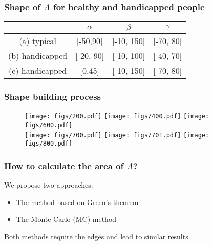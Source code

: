\documentclass{beamer}
\newcommand{\play}{\rotatebox[origin=c]{90}{$\blacktriangledown$}}
\begin{document}
\begin{frame}

\frametitle{Shape of $A$ for healthy and handicapped people}
\begin{figure}[!ht]
  \centering
  \label{fig:compari}
\end{figure}

\begin{center}
\begin{tabular}{|c|c|c|c|}
\hline
  &  $\alpha$ & $\beta$ & $\gamma$ \\\hline
 (a) typical & [-50,90] & [-10, 150] & [-70, 80] \\\hline
 (b) handicapped & [-20, 90] & [-10, 100] & [-40, 70] \\\hline
 (c) handicapped & [0,45] & [-10, 150] & [-70, 80] \\\hline
\end{tabular}
\end{center}
\end{frame}


\begin{frame}
\frametitle{Shape building process}
\centering
\movie[externalviewer]{\play}{mov/movie2.avi}
\begin{figure}[!ht]
  \centering
  \texttt{[image: figs/200.pdf]}
  \texttt{[image: figs/400.pdf]}
  \texttt{[image: figs/600.pdf]} \\
  \texttt{[image: figs/700.pdf]}
  \texttt{[image: figs/701.pdf]}
  \texttt{[image: figs/800.pdf]}
\label{fig:shapebuild}
\end{figure}
\end{frame}


\begin{frame}
\frametitle{How to calculate the area of $A$?}
We propose two approaches:
\begin{block}{}
\begin{itemize}
\item The method based on Green's theorem
\item The Monte Carlo (MC) method
\end{itemize}
\end{block}
Both methods require the edges and lead to similar results.
\end{frame}
\end{document}
